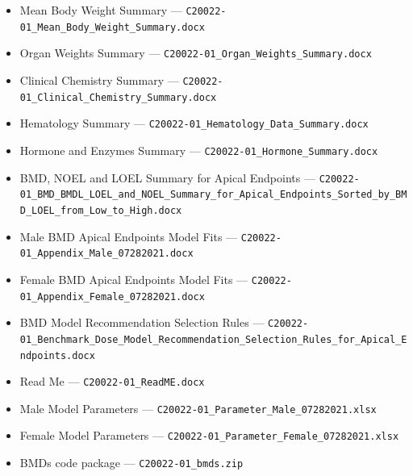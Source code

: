 \begin{itemize}
  \item Mean Body Weight Summary --- \texttt{C20022-01\_Mean\_Body\_Weight\_Summary.docx}
  \item Organ Weights Summary --- \texttt{C20022-01\_Organ\_Weights\_Summary.docx}
  \item Clinical Chemistry Summary --- \texttt{C20022-01\_Clinical\_Chemistry\_Summary.docx}
  \item Hematology Summary --- \texttt{C20022-01\_Hematology\_Data\_Summary.docx}
  \item Hormone and Enzymes Summary --- \texttt{C20022-01\_Hormone\_Summary.docx}
  \item BMD, NOEL and LOEL Summary for Apical Endpoints --- \texttt{C20022-01\_BMD\_BMDL\_LOEL\_and\_NOEL\_Summary\_for\_Apical\_Endpoints\_Sorted\_by\_BMD\_LOEL\_from\_Low\_to\_High.docx}
  \item Male BMD Apical Endpoints Model Fits --- \texttt{C20022-01\_Appendix\_Male\_07282021.docx}
  \item Female BMD Apical Endpoints Model Fits --- \texttt{C20022-01\_Appendix\_Female\_07282021.docx}
  \item BMD Model Recommendation Selection Rules --- \texttt{C20022-01\_Benchmark\_Dose\_Model\_Recommendation\_Selection\_Rules\_for\_Apical\_Endpoints.docx}
  \item Read Me --- \texttt{C20022-01\_ReadME.docx}
  \item Male Model Parameters --- \texttt{C20022-01\_Parameter\_Male\_07282021.xlsx}
  \item Female Model Parameters --- \texttt{C20022-01\_Parameter\_Female\_07282021.xlsx}
  \item BMDs code package --- \texttt{C20022-01\_bmds.zip}
\end{itemize}
